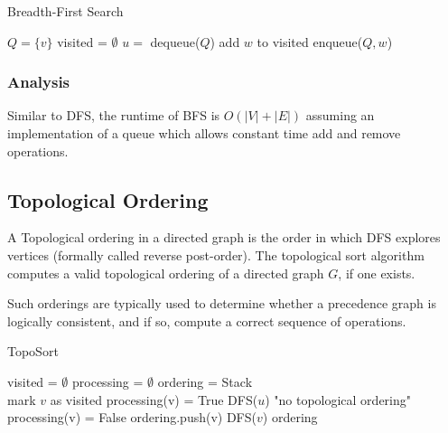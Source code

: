 \documentclass{standalone}
\begin{document}
\begin{algorithm}
  \caption{Breadth-First Search}
  \begin{algorithmic}
  \State $Q = \{v\}$
  \State visited = $\emptyset$
    \State $u =$ dequeue($Q$)
        \State add $w$ to visited
        \State enqueue($Q, w$)
      \EndIf
    \EndFor
  \EndWhile
  \end{algorithmic}
\end{algorithm}

\subsubsection{Analysis}

Similar to DFS, the runtime of BFS is $O(|V| + |E|)$ assuming an implementation of a queue which allows constant time add and remove operations.

\subsection{Topological Ordering}

A Topological ordering in a directed graph is the order in which DFS explores vertices (formally called reverse post-order).  The topological sort algorithm computes a valid topological ordering of a directed graph $G$, if one exists.

Such orderings are typically used to determine whether a precedence graph is logically consistent, and if so, compute a correct sequence of operations.

\begin{algorithm}
  \caption{TopoSort}
  \begin{algorithmic}
  \State visited = $\emptyset$
  \State processing = $\emptyset$
  \State ordering = Stack \\
    \State mark $v$ as visited
    \State processing(v) = True
        \State DFS($u$)
        \Return	"no topological ordering"
      \EndIf
    \EndFor
    \State processing(v) = False
    \State ordering.push(v)
  \EndProcedure
      \State DFS($v$)
    \EndIf
  \EndFor
  \Return ordering
  \end{algorithmic}
\end{algorithm}
\end{document}
